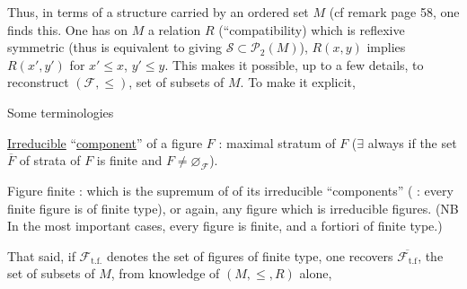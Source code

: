 Thus, in terms of a structure carried by an ordered set $M$ (cf remark page 58, one finds this. One has on  $M$ a relation $R$ (``compatibility) which is reflexive symmetric (thus is equivalent to giving $\mathcal S\subset\mathcal P_2(M)$),  $R(x,y)$ implies $R(x',y')$ for $x'\leq x$, $y'\leq y$.  This makes it possible, up to a few details, to reconstruct $(\mathcal F,\leq)$,  set of subsets of $M$. To make it explicit,

Some terminologies

\uline{Irreducible} ``\uline{component}''  of a figure $F$ : maximal stratum of $F$ ($\exists$ always if the set $\overline F$ of strata of $F$ is finite  and $F\ne\varnothing_{\mathcal F}$).

Figure  finite : which is the supremum of  of its irreducible ``components'' ( : every finite figure is of finite type), or again, any figure  which is  irreducible figures.  (NB In the most important cases, every figure is finite, and a fortiori of finite type.)

That said, if $\mathcal F_{\mathrm{t.f.}}$ denotes the set of figures of finite type, one recovers $\overline{\mathcal F_{\mathrm{t.f}}}$, the set of  subsets of $M$, from knowledge of $(M,\leq,R)$ alone,
